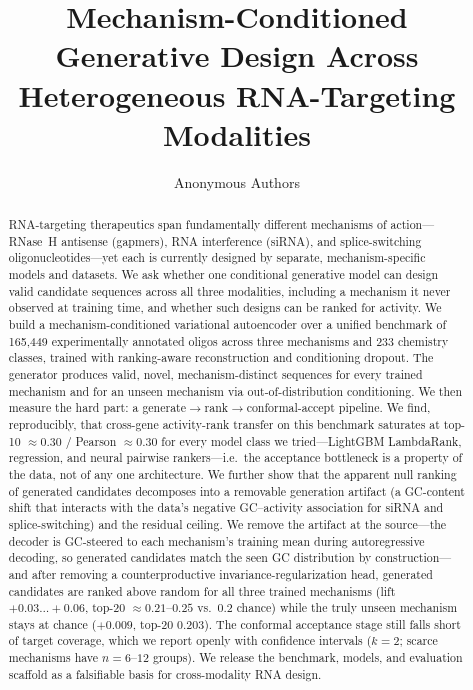 \documentclass{article} %
\title{Mechanism-Conditioned Generative Design Across \\ Heterogeneous RNA-Targeting Modalities}
\author{Anonymous Authors}
\begin{document}
\maketitle

\begin{abstract}
RNA-targeting therapeutics span fundamentally different mechanisms of action---RNase~H antisense (gapmers), RNA interference (siRNA), and splice-switching oligonucleotides---yet each is currently designed by separate, mechanism-specific models and datasets. We ask whether one conditional generative model can design valid candidate sequences across all three modalities, including a mechanism it never observed at training time, and whether such designs can be ranked for activity. We build a mechanism-conditioned variational autoencoder over a unified benchmark of 165{,}449 experimentally annotated oligos across three mechanisms and 233 chemistry classes, trained with ranking-aware reconstruction and conditioning dropout. The generator produces valid, novel, mechanism-distinct sequences for every trained mechanism and for an unseen mechanism via out-of-distribution conditioning. We then measure the hard part: a generate$\rightarrow$rank$\rightarrow$conformal-accept pipeline. We find, reproducibly, that cross-gene activity-rank transfer on this benchmark saturates at top-10 $\approx 0.30$ / Pearson $\approx 0.30$ for every model class we tried---LightGBM LambdaRank, regression, and neural pairwise rankers---i.e.\ the acceptance bottleneck is a property of the data, not of any one architecture. We further show that the apparent null ranking of generated candidates decomposes into a removable generation artifact (a GC-content shift that interacts with the data's negative GC--activity association for siRNA and splice-switching) and the residual ceiling. We remove the artifact at the source---the decoder is GC-steered to each mechanism's training mean during autoregressive decoding, so generated candidates match the seen GC distribution by construction---and after removing a counterproductive invariance-regularization head, generated candidates are ranked above random for all three trained mechanisms (lift $+0.03\ldots+0.06$, top-20 $\approx 0.21$--$0.25$ vs.\ $0.2$ chance) while the truly unseen mechanism stays at chance ($+0.009$, top-20 $0.203$). The conformal acceptance stage still falls short of target coverage, which we report openly with confidence intervals ($k{=}2$; scarce mechanisms have $n{=}6$--$12$ groups). We release the benchmark, models, and evaluation scaffold as a falsifiable basis for cross-modality RNA design.
\end{abstract}
\end{document}
